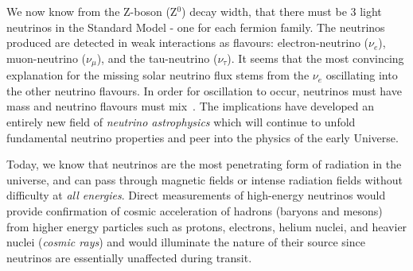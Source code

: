 \par We now know from the Z-boson (Z$^0$) decay width, that there must be 3 light neutrinos in the Standard Model - one for each fermion family.  The neutrinos produced are detected in weak interactions as flavours:  electron-neutrino ($\nu_e$), muon-neutrino ($\nu_{\mu}$), and the tau-neutrino ($\nu_{\tau}$).  It seems that the most convincing explanation for the missing solar neutrino flux stems from the $\nu_e$ oscillating into the other neutrino flavours.  In order for oscillation to occur, neutrinos must have mass and neutrino flavours must mix~\cite{Coughlan.2006}.  The implications have developed an entirely new field of \emph{neutrino astrophysics} which will continue to unfold fundamental neutrino properties and peer into the physics of the early Universe.

\par Today, we know that neutrinos are the most penetrating form of radiation in the universe, and can pass through magnetic fields or intense radiation fields without difficulty at \emph{all energies}.  Direct measurements of high-energy neutrinos would provide confirmation of cosmic acceleration of hadrons (baryons and mesons) from higher energy particles such as protons, electrons, helium nuclei, and heavier nuclei (\emph{cosmic rays}) and would illuminate the nature of their source since neutrinos are essentially unaffected during transit.


